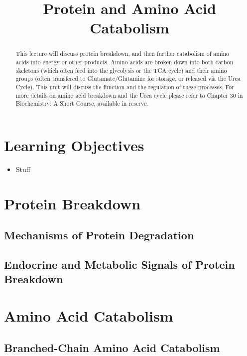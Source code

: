 \documentclass{tufte-handout}
\title{Protein and Amino Acid Catabolism}
\author{}
\date{}  %
\begin{document}
\maketitle%

\begin{abstract}
\noindent This lecture will discuss protein breakdown, and then further catabolism of amino acids into energy or other products.  Amino acids are broken down into both carbon skeletons (which often feed into the glycolysis or the TCA cycle) and their amino groups (often transfered to Glutamate/Glutamine for storage, or released via the Urea Cycle).  This unit will discuss the function and the regulation of these processes.  For more details on amino acid breakdown and the Urea cycle please refer to Chapter 30 in Biochemistry: A Short Course, available in reserve\cite{Berg2015}.
\end{abstract}

\tableofcontents

\pagebreak
\section{Learning Objectives}

\begin{itemize}
\item Stuff
\end{itemize}

\section{Protein Breakdown}

\subsection{Mechanisms of Protein Degradation}

\subsection{Endocrine and Metabolic Signals of Protein Breakdown}

\section{Amino Acid Catabolism}

\subsection{Branched-Chain Amino Acid Catabolism}
\end{document}
